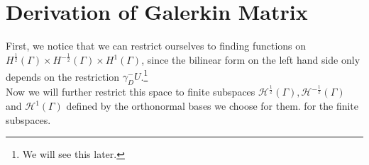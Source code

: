 \documentclass[10pt,journal,compsoc, onecolumn]{IEEEtran}
\newtheorem{theorem}{Theorem}[section]
\newtheorem{definition}[theorem]{Definition}
\newtheorem{remark}[theorem]{Remark}
\begin{document}

\section{Derivation of Galerkin Matrix}
First, we notice that we can restrict ourselves to finding functions on $H^{\frac{1}{2}}(\Gamma)\times H^{-\frac{1}{2}}(\Gamma) \times H^1(\Gamma)$,
 since the bilinear form on the left hand side only depends on the restriction $\gamma_D^-U$.\footnote{We will see this later.} \\
Now we will further restrict this space to finite subspaces $\mathcal{H}^{\frac{1}{2}}(\Gamma), \mathcal{H}^{-\frac{1}{2}}(\Gamma)$ and $\mathcal{H}^1(\Gamma)$ 
defined by the orthonormal bases we choose for them. 
 for the finite subspaces. 
\end{document}
